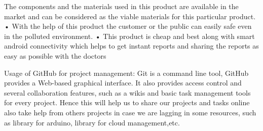 \documentclass[12pt]{article}
\begin{document}
The components and the materials used in this product are available in the market and can be considered as the viable materials for this particular product. 
\newline
•	With the help of this product the customer or the public can easily safe even in the polluted environment.
\newline
•	This product is cheap and best along with smart android connectivity which helps to get instant reports and sharing the reports as easy as possible with the doctors

\newpage 
\centering
Usage of GitHub for project management:
\vspace{1ex}
\newline
Git is a command line tool, GitHub provides a Web-based graphical interface. It also provides access control and several collaboration features, such as a wikis and basic 
task management tools for every project. 
\newline
Hence this will help us to share our projects and tasks online also take help from others projects in case we are lagging in some resources, such as library for arduino, library for cloud management,etc.
\end{document}
